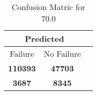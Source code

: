 \begin{table}[] 
\caption{Confusion Matric for 70.0} 
\label{Table: Prediction Accuracy-None70.0RandomForest100EKF-ignoreReflection-Reflection} 
\centering 
\begin{tabular} 
 {@{}ccc@{}} 
\toprule 
\multicolumn{2}{c}{\textbf{Predicted}}
 \\ \midrule 
\multicolumn{1}{|c|}{Failure} & 
\multicolumn{1}{c|}{No Failure}
 \\ \midrule 
\multicolumn{1}{|c|}{\color{green}\textbf{110393}} & 
\multicolumn{1}{c|}{\color{green}\textbf{47703}}
 \\ \midrule 
\multicolumn{1}{|c|}{\color{red}\textbf{3687}} & 
\multicolumn{1}{c|}{\color{red}\textbf{8345}}
 \\ \bottomrule 
\end{tabular} 
\end{table} 
